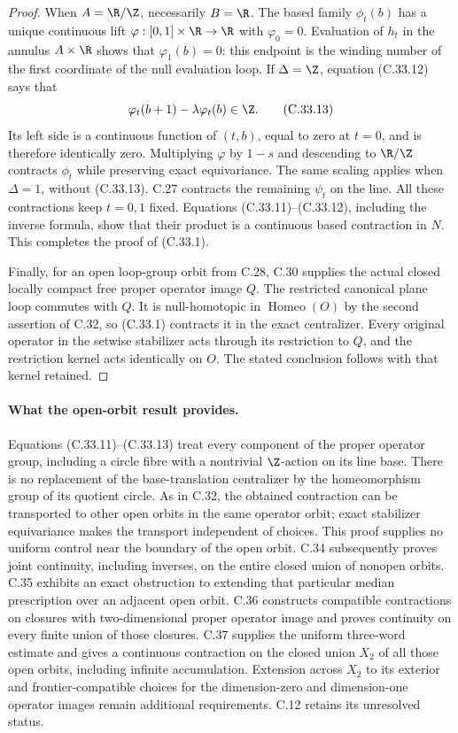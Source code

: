 \begin{proof}
When $A=\R/\Z$, necessarily $B=\R$.
The based family $\phi_t(b)$ has a unique continuous lift
$\varphi:[0,1]\times\R\to\R$ with $\varphi_0=0$.
Evaluation of $h_t$ in the annulus $A\times\R$ shows that
$\varphi_1(b)=0$: this endpoint is the winding number of
the first coordinate of the null evaluation loop.
If $\Delta=\Z$, equation (C.33.12) says that
\[
           \varphi_t(b+1)-\lambda\varphi_t(b)\in\Z.
                                                       \tag{C.33.13}
\]
Its left side is a continuous function of $(t,b)$, equal
to zero at $t=0$, and is therefore identically zero.
Multiplying $\varphi$ by $1-s$ and descending to $\R/\Z$
contracts $\phi_t$ while preserving exact equivariance.
The same scaling applies when $\Delta=1$, without (C.33.13).
C.27 contracts the remaining $\psi_t$ on the line.
All these contractions keep $t=0,1$ fixed. Equations
(C.33.11)--(C.33.12), including the inverse formula, show
that their product is a continuous based contraction in
$N$. This completes the proof of (C.33.1).

Finally, for an open loop-group orbit from C.28, C.30
supplies the actual closed locally compact free proper
operator image $Q$. The restricted canonical plane loop
commutes with $Q$. It is null-homotopic in
$\operatorname{Homeo}(O)$ by the second assertion of
C.32, so (C.33.1) contracts it in the exact centralizer.
Every original operator in the setwise stabilizer acts
through its restriction to $Q$, and the restriction
kernel acts identically on $O$. The stated conclusion
follows with that kernel retained.
\end{proof}

\paragraph{What the open-orbit result provides.}
Equations (C.33.11)--(C.33.13) treat every component of the
proper operator group, including a circle fibre with a
nontrivial $\Z$-action on its line base. There is no
replacement of the base-translation centralizer by the
homeomorphism group of its quotient circle.
As in C.32, the obtained contraction can be transported to
other open orbits in the same operator orbit; exact
stabilizer equivariance makes the transport independent
of choices. This proof supplies no uniform control near
the boundary of the open orbit. C.34 subsequently proves
joint continuity, including inverses, on the entire closed
union of nonopen orbits. C.35 exhibits an exact obstruction
to extending that particular median prescription over an
adjacent open orbit. C.36 constructs compatible contractions
on closures with two-dimensional proper operator image and
proves continuity on every finite union of those closures.
C.37 supplies the uniform three-word estimate and gives a
continuous contraction on the closed union $X_2$ of all those
open orbits, including infinite accumulation. Extension across
$X_2$ to its exterior and frontier-compatible choices for the
dimension-zero and dimension-one operator images remain
additional requirements. C.12 retains its unresolved status.
